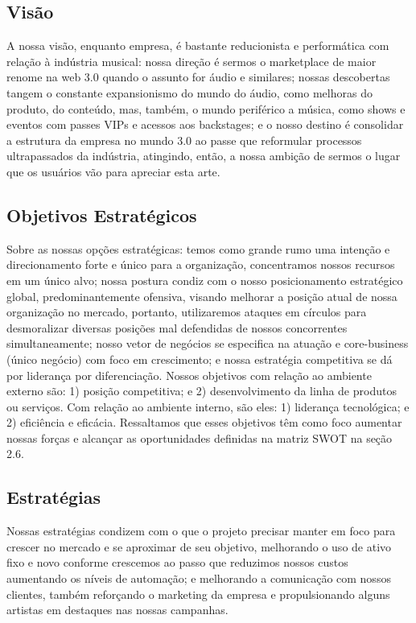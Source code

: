 \documentclass[onecolumn,12pt]{asme2ej}
\begin{document}
\subsection{Visão}

A nossa visão, enquanto empresa, é bastante reducionista e performática com relação à indústria musical: nossa direção é sermos o marketplace de maior renome na web 3.0 quando o assunto for áudio e similares; nossas descobertas tangem o constante expansionismo do mundo do áudio, como melhoras do produto, do conteúdo, mas, também, o mundo periférico a música, como shows e eventos com passes VIPs e acessos aos backstages; e o nosso destino é consolidar a estrutura da empresa no mundo 3.0 ao passe que reformular processos ultrapassados da indústria, atingindo, então, a nossa ambição de sermos o lugar que os usuários vão para apreciar esta arte.

\subsection{Objetivos Estratégicos}

Sobre as nossas opções estratégicas: temos como grande rumo uma intenção e direcionamento forte e único para a organização, concentramos nossos recursos em um único alvo; nossa postura condiz com o nosso posicionamento estratégico global, predominantemente ofensiva, visando melhorar a posição atual de nossa organização no mercado, portanto, utilizaremos ataques em círculos para desmoralizar diversas posições mal defendidas de nossos concorrentes simultaneamente; nosso vetor de negócios se especifica na atuação e core-business (único negócio) com foco em crescimento; e nossa estratégia competitiva se dá por liderança por diferenciação. Nossos objetivos com relação ao ambiente externo são: 1) posição competitiva; e 2) desenvolvimento da linha de produtos ou serviços. Com relação ao ambiente interno, são eles: 1) liderança tecnológica; e 2) eficiência e eficácia. Ressaltamos que esses objetivos têm como foco aumentar nossas forças e alcançar as oportunidades definidas na matriz SWOT na seção 2.6.

\subsection{Estratégias}

Nossas estratégias condizem com o que o projeto precisar manter em foco para crescer no mercado e se aproximar de seu objetivo, melhorando o uso de ativo fixo e novo conforme crescemos ao passo que reduzimos nossos custos aumentando os níveis de automação; e melhorando a comunicação com nossos clientes, também reforçando o marketing da empresa e propulsionando alguns artistas em destaques nas nossas campanhas.
\end{document}
